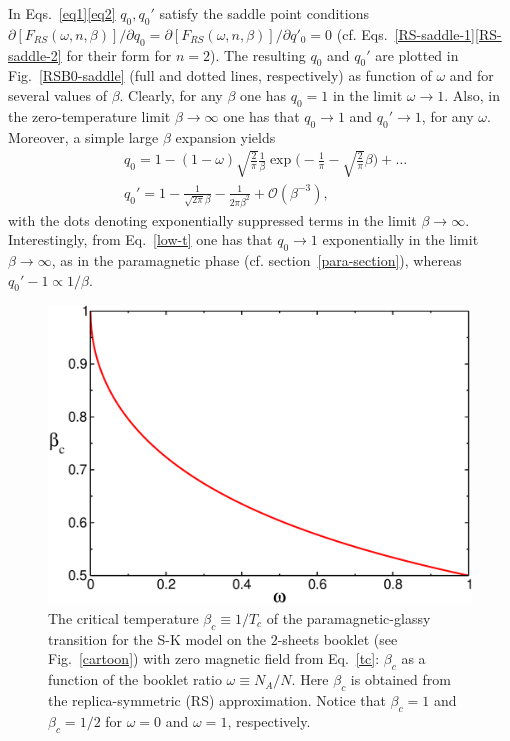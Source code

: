 \documentclass[twocolumn,superscriptaddress,prb,10pt]{revtex4-1}
\begin{document}
In Eqs.~\eqref{eq1}\eqref{eq2} $q_0,q_0'$ satisfy the saddle point conditions 
$\partial[F_{RS}(\omega,n,\beta)]/\partial q_0=\partial[F_{RS}(\omega,n,\beta)]/
\partial q'_0=0$ (cf. Eqs.~\eqref{RS-saddle-1}\eqref{RS-saddle-2} for their 
form for $n=2$). The resulting $q_0$ and $q_0'$ are plotted in Fig.~\ref{RSB0-saddle} 
(full and dotted lines, respectively) as function of $\omega$ and for several 
values of $\beta$. Clearly, for any $\beta$ one has $q_0=1$ in the limit 
$\omega\to 1$. Also, in the zero-temperature limit $\beta\to\infty$ one has 
that $q_0\to 1$ and $q_0'\to 1$, for any $\omega$. Moreover, a simple large $\beta$ 
expansion yields  
%
\begin{align}
\label{low-t}
& q_0=1 -(1-\omega)\sqrt{\frac{2}{\pi}}\frac{1}{\beta}\exp\Big(-\frac{1}{\pi}-
\sqrt{\frac{2}{\pi}}\beta\Big)+\dots
\\ 
& q_0'=1-\frac{1}{\sqrt{2\pi}\beta}-\frac{1}{2\pi\beta^2}+{\mathcal O}(\beta^{-3}),
\end{align}
%
with the dots denoting exponentially suppressed terms in the limit $\beta\to\infty$. 
Interestingly, from Eq.~\eqref{low-t} one has that $q_0\to 1$ exponentially in the limit $\beta\to\infty$, 
as in the paramagnetic phase (cf. section~\ref{para-section}), whereas 
$q_0'-1\propto 1/\beta$. 


\begin{figure}[t]
\includegraphics*[width=0.9\linewidth]{./draft_figs/betac}
\caption{
 The critical temperature $\beta_c\equiv 1/T_c$ of the paramagnetic-glassy 
 transition for the S-K model on the $2$-sheets booklet (see Fig.~\ref{cartoon}) 
 with zero magnetic field from Eq.~\eqref{tc}: $\beta_c$ as a function of the booklet ratio $\omega
 \equiv N_A/N$. Here $\beta_c$  is obtained from the replica-symmetric (RS) 
 approximation. Notice that $\beta_c=1$ and $\beta_c=1/2$ for $\omega=0$ and 
 $\omega=1$, respectively. 
}
\label{beta_c}
\end{figure}
\end{document}
